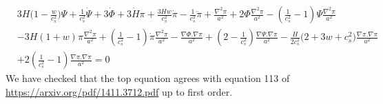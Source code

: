 \documentclass[a4paper,11pt]{article}
\begin{document}
\begin{align} 
 & 3 {H}  \Big( 1- \frac{w}{c_s^2} \Big )
\Psi + \frac{ 1}{c_s^2} \dot{\Psi} + 3 \dot{\Phi} +3 \dot{H} \pi + \frac{3 {H} w}{c_s^2} \dot{\pi} -\frac{  1}{c_s^2} \ddot{\pi} + \frac{\nabla^2 \pi }{a^2}
     +2   \Phi  \frac{\nabla^2 \pi }{a^2}   
  -   (\frac{1}{c_s^2}-1)  \Psi \frac{\nabla^2 \pi }{a^2}   
        \nonumber \\ &
  - 3 H (1+w)\pi \frac{\nabla^2 \pi }{a^2}  
        +   (\frac{1}{c_s^2}-1)    \dot{\pi } \frac{\nabla^2 {\pi }}{a^2}   
             - \frac{\nabla  \Phi . \nabla \pi }{a^2} 
        +(2-\frac{1}{c_s^2}) \frac{\nabla  \Psi . \nabla \pi }{a^2}   
 -\frac{H} {2 c_s^2} \Big(2+3w+c_s^2  \Big)\frac{\nabla  \pi . \nabla \pi } {a^2}
    \nonumber \\ &
    +2   (\frac{1}{c_s^2}-1)\frac{\nabla  \pi . \nabla \dot{\pi} } {a^2}     =0 \label{fineq}
  \end{align} 
  We have checked that the top equation agrees with equation 113 of \url{https://arxiv.org/pdf/1411.3712.pdf} up to first order. 
\end{document}
